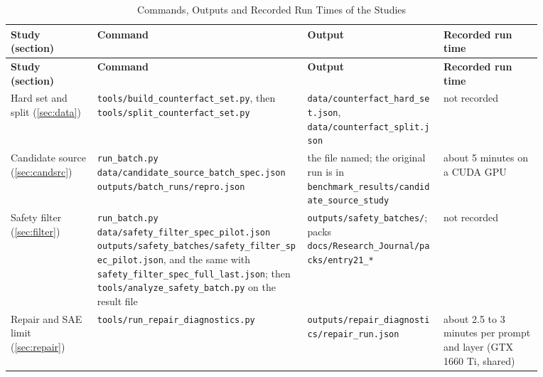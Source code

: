 \documentclass[12pt,a4paper]{report}
\begin{document}
{\small\renewcommand{\arraystretch}{1.15}
\begin{longtable}{|>{\raggedright\arraybackslash}p{0.148\linewidth}|>{\raggedright\arraybackslash}p{0.340\linewidth}|>{\raggedright\arraybackslash}p{0.222\linewidth}|>{\raggedright\arraybackslash}p{0.163\linewidth}|}
\caption{Commands, Outputs and Recorded Run Times of the Studies}\label{tab:repro}\\
\hline
\textbf{Study (section)} & \textbf{Command} & \textbf{Output} & \textbf{Recorded run time} \\ \hline
\endfirsthead
\hline
\textbf{Study (section)} & \textbf{Command} & \textbf{Output} & \textbf{Recorded run time} \\ \hline
\endhead
Hard set and split (\ref{sec:data}) & \texttt{tools/\allowbreak{}build\_\allowbreak{}counterfact\_\allowbreak{}set.\allowbreak{}py}, then \texttt{tools/\allowbreak{}split\_\allowbreak{}counterfact\_\allowbreak{}set.\allowbreak{}py} & \texttt{data/\allowbreak{}counterfact\_\allowbreak{}hard\_\allowbreak{}set.\allowbreak{}json}, \texttt{data/\allowbreak{}counterfact\_\allowbreak{}split.\allowbreak{}json} & not recorded \\ \hline
Candidate source (\ref{sec:candsrc}) & \texttt{run\_\allowbreak{}batch.\allowbreak{}py data/\allowbreak{}candidate\_\allowbreak{}source\_\allowbreak{}batch\_\allowbreak{}spec.\allowbreak{}json outputs/\allowbreak{}batch\_\allowbreak{}runs/\allowbreak{}repro.\allowbreak{}json} & the file named; the original run is in \texttt{benchmark\_\allowbreak{}results/\allowbreak{}candidate\_\allowbreak{}source\_\allowbreak{}study} & about 5 minutes on a CUDA GPU \\ \hline
Safety filter (\ref{sec:filter}) & \texttt{run\_\allowbreak{}batch.\allowbreak{}py data/\allowbreak{}safety\_\allowbreak{}filter\_\allowbreak{}spec\_\allowbreak{}pilot.\allowbreak{}json outputs/\allowbreak{}safety\_\allowbreak{}batches/\allowbreak{}safety\_\allowbreak{}filter\_\allowbreak{}spec\_\allowbreak{}pilot.\allowbreak{}json}, and the same with \texttt{safety\_\allowbreak{}filter\_\allowbreak{}spec\_\allowbreak{}full\_\allowbreak{}last.\allowbreak{}json}; then \texttt{tools/\allowbreak{}analyze\_\allowbreak{}safety\_\allowbreak{}batch.\allowbreak{}py} on the result file & \texttt{outputs/\allowbreak{}safety\_\allowbreak{}batches/\allowbreak{}}; packs \texttt{docs/\allowbreak{}Research\_\allowbreak{}Journal/\allowbreak{}packs/\allowbreak{}entry21\_\allowbreak{}*} & not recorded \\ \hline
Repair and SAE limit (\ref{sec:repair}) & \texttt{tools/\allowbreak{}run\_\allowbreak{}repair\_\allowbreak{}diagnostics.\allowbreak{}py} & \texttt{outputs/\allowbreak{}repair\_\allowbreak{}diagnostics/\allowbreak{}repair\_\allowbreak{}run.\allowbreak{}json} & about 2.5 to 3 minutes per prompt and layer (GTX 1660 Ti, shared) \\ \hline

\end{longtable}}
\end{document}
